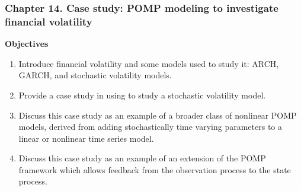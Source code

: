 \documentclass{beamer}\usepackage[]{graphicx}\usepackage[]{color}
\newcommand\CHAPTER{14}
\begin{document}









\begin{frame}[fragile]
\frametitle{Chapter \CHAPTER. Case study: POMP modeling to investigate financial volatility}

\hspace{3cm} {\large \bf Objectives}

\vspace{3mm}

\begin{enumerate}

\item Introduce financial volatility and some models used to study it: ARCH, GARCH, and stochastic volatility models. 

\item Provide a case study in using  to study a stochastic volatility model.

\item Discuss this case study as an example of a broader class of nonlinear POMP models, derived from adding stochastically time varying parameters to a linear or nonlinear time series model.

\item Discuss this case study as an example of an extension of the POMP framework which allows feedback from the observation process to the state process.

\end{enumerate}

\end{frame}
\end{document}
